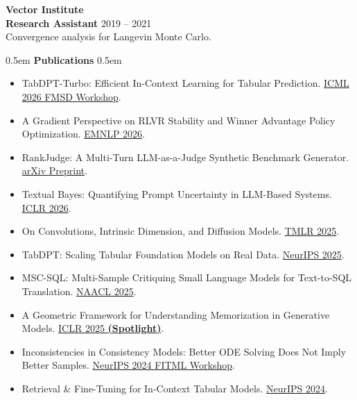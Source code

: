 \documentclass[11pt,a4paper]{article}
\newcommand{\cvsection}[1]{%
    \vspace{10pt}
    \noindent\hfill\kern0.5em
    {\Huge \textbf{\textcolor{maincolor}{#1}}}%
    \kern0.5em\hfill\vspace{8pt}
}
\begin{document}
{\Large \textbf{\textcolor{maincolor}{Vector Institute}}} \\
\textbf{Research Assistant} \hfill 2019 -- 2021 \\
{\small Convergence analysis for Langevin Monte Carlo.}
\vspace{15pt}

\cvsection{Publications}
{\fontsize{9}{10.5}\selectfont
\begin{itemize}[noitemsep, topsep=4pt, leftmargin=0em, label=\textcolor{maincolorlight}{$\circ$}]
    \item TabDPT-Turbo: Efficient In-Context Learning for Tabular Prediction. {\textcolor{venuecolor}{\href{https://openreview.net/forum?id=Y00pwFyrHR}{ICML 2026 FMSD Workshop}}}.
    \item A Gradient Perspective on RLVR Stability and Winner Advantage Policy Optimization. {\textcolor{venuecolor}{\href{https://aclanthology.org/2026.emnlp-main.2371/}{EMNLP 2026}}}.
    \item RankJudge: A Multi-Turn LLM-as-a-Judge Synthetic Benchmark Generator. {\textcolor{venuecolor}{\href{https://arxiv.org/abs/2605.21748}{arXiv Preprint}}}.
    \item Textual Bayes: Quantifying Prompt Uncertainty in LLM-Based Systems. {\textcolor{venuecolor}{\href{https://openreview.net/forum?id=VPmsAr1OTl}{ICLR 2026}}}.
    \item On Convolutions, Intrinsic Dimension, and Diffusion Models. {\textcolor{venuecolor}{\href{https://openreview.net/forum?id=xSzBf1te4s}{TMLR 2025}}}.
    \item TabDPT: Scaling Tabular Foundation Models on Real Data. {\textcolor{venuecolor}{\href{https://openreview.net/forum?id=pIZxEOZCId}{NeurIPS 2025}}}.
    \item MSC-SQL: Multi-Sample Critiquing Small Language Models for Text-to-SQL Translation. {\textcolor{venuecolor}{\href{https://aclanthology.org/2025.naacl-long.107/}{NAACL 2025}}}.
    \item A Geometric Framework for Understanding Memorization in Generative Models. {\textcolor{venuecolor}{\href{https://openreview.net/forum?id=aZ1gNJu8wO}{ICLR 2025 \mbox{\textbf{(Spotlight)}}}}}.
    \item Inconsistencies in Consistency Models: Better ODE Solving Does Not Imply Better Samples. {\textcolor{venuecolor}{\href{https://openreview.net/forum?id=2p4ES8QPUi}{NeurIPS 2024 FITML Workshop}}}.
    \item Retrieval \& Fine-Tuning for In-Context Tabular Models. {\textcolor{venuecolor}{\href{https://proceedings.neurips.cc/paper_files/paper/2024/hash/c40daf14d7a6469e65116507c21faeb7-Abstract-Conference.html}{NeurIPS 2024}}}.

\end{itemize}}
\end{document}

